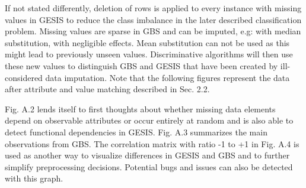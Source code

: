 If not stated differently, deletion of rows is applied to every instance with missing values in GESIS to reduce the class imbalance in the later described classification problem. Missing values are sparse in GBS and can be imputed, e.g: with median substitution, with negligible effects. Mean substitution can not be used as this might lead to previously unseen values. Discriminative algorithms will then use these new values to distinguish GBS and GESIS that have been created by ill-considered data imputation. Note that the following figures represent the data after attribute and value matching described in Sec. 2.2.

Fig. A.2 lends itself to first thoughts about whether missing data elements depend on observable attributes or occur entirely at random and is also able to detect functional dependencies in GESIS. Fig. A.3 summarizes the main observations from GBS. The correlation matrix with ratio -1 to +1 in Fig. A.4 is used as another way to visualize differences in GESIS and GBS and to further simplify preprocessing decisions. Potential bugs and issues can also be detected with this graph. 


